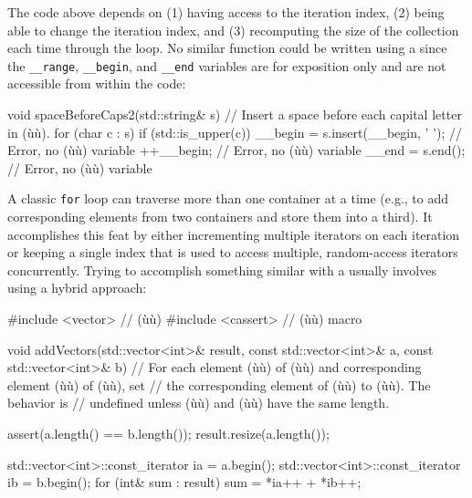 {{{\noindent The code above depends on (1) having access to the iteration index, (2)
being able to change the iteration index, and (3) recomputing the size
of the collection each time through the loop. No similar function could
be written using a  since the
\lstinline!__range!, \lstinline!__begin!, and \lstinline!__end! variables
are for exposition only and are not accessible from within the code:

\begin{emcppslisting}
void spaceBeforeCaps2(std::string& s)
{
    // Insert a space before each capital letter in (ù{}ù).
    for (char c : s)
    {
        if (std::is_upper(c))
        {
            __begin = s.insert(__begin, ' ');  // Error, no (ù{}ù) variable
            ++__begin;                         // Error, no (ù{}ù) variable
            __end = s.end();                   // Error, no (ù{}ù) variable
        }
    }
}
\end{emcppslisting}
    

\noindent A classic \lstinline!for! loop can traverse more than one container at a
time (e.g., to add corresponding elements from two containers and store
them into a third). It accomplishes this feat by either incrementing
multiple iterators on each iteration or keeping a single index that is
used to access multiple, random-access iterators concurrently. Trying to
accomplish something similar with a  usually involves using a hybrid approach:

\begin{emcppslisting}
#include <vector>   // (ù{}ù)
#include <cassert>  // (ù{}ù) macro

void addVectors(std::vector<int>&       result,
                const std::vector<int>& a,
                const std::vector<int>& b)
    // For each element (ù{}ù) of (ù{}ù) and corresponding element (ù{}ù) of (ù{}ù), set
    // the corresponding element of (ù{}ù) to (ù{}ù).  The behavior is
    // undefined unless (ù{}ù) and (ù{}ù) have the same length.
{
    assert(a.length() == b.length());
    result.resize(a.length());

    std::vector<int>::const_iterator ia = a.begin();
    std::vector<int>::const_iterator ib = b.begin();
    for (int& sum : result)
    {
        sum = *ia++ + *ib++;
    }
}
\end{emcppslisting}
    

}}}
